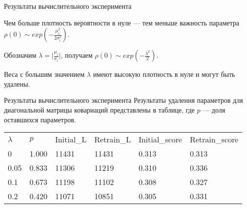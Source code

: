 \documentclass{beamer}
\begin{document}
\begin{frame}{Результаты вычислительного эксперимента}

Чем больше плотность вероятности в нуле --- тем меньше важность параметра $\rho(0) \sim exp(-\frac{\mu_i^2}{2\sigma_i^2})$.

Обозначим $\lambda = \big|\frac{\mu_i}{\sigma_i}\big|$, получаем $\rho(0) \sim exp(-\frac{\lambda^2}{2})$.

\smallskip
Веса с большим значением $\lambda$ имеют высокую плотность в нуле и могут быть удалены.

\end{frame}

\begin{frame}{Результаты вычислительного эксперимента}
Результаты удаления параметров для диагональной матрицы ковариаций представлены в таблице, где $p$ --- доля оставшихся параметров.
\vspace{-0.3cm}
\begin{table}[]
	\centering
	\label{my-label}
	\begin{tabular}{|l|l|l|l|l|l|}
		\hline
		\multirow{2}{*}{$\lambda$} & \multirow{2}{*}{$p$} & \multirow{2}{*}{Initial\_L} & \multirow{2}{*}{Retrain\_L} & \multirow{2}{*}{Initial\_score} & \multirow{2}{*}{Retrain\_score} \\
		&                                       &                                    &                                    &                                 &                                 \\ \hline
		0                 & 1.000                                 & 11431                              & 11431                              & 0.313                           & 0.313                           \\ \hline
		0.05              & 0.833                                 & 11306                              & 11219                              & 0.310                           & 0.336                           \\ \hline
		0.1               & 0.673                                 & 11198                              & 11102                              & 0.308                           & 0.327                           \\ \hline
		0.2               & 0.420                                 & 11071                              & 10851                              & 0.305                           & 0.331                           \\ \hline

\end{tabular}
\end{table}
\end{frame}
\end{document}
